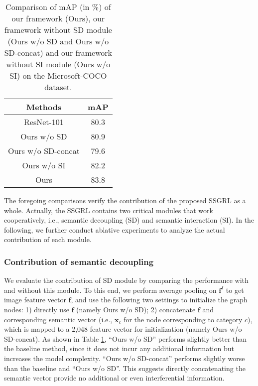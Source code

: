 \documentclass[10pt,twocolumn,letterpaper]{article}
\begin{document}
\begin{table}[!t]
\centering
\begin{tabular}{c|c}
\hline
\centering  Methods & mAP \\
\hline
\hline
ResNet-101 \cite{he2016deep} &80.3\\
\hline
Ours w/o SD & 80.9  \\
Ours w/o SD-concat & 79.6  \\
Ours w/o SI & 82.2  \\
Ours & 83.8   \\
\hline
\end{tabular}
\vspace{2pt}
\caption{Comparison of mAP (in \%) of our framework (Ours), our framework without SD module (Ours w/o SD and Ours w/o SD-concat) and our framework without SI module (Ours w/o SI) on the Microsoft-COCO dataset.}
\label{table:result-ablation}
\end{table}

The foregoing comparisons verify the contribution of the proposed SSGRL as a whole. Actually, the SSGRL contains two critical modules that work cooperatively, i.e., semantic decoupling (SD) and semantic interaction (SI). In the following, we further conduct ablative experiments to analyze the actual contribution of each module.



\subsubsection{Contribution of semantic decoupling}
We evaluate the contribution of SD module by comparing the performance with and without this module. To this end, we perform average pooling on $\mathbf{f}^I$ to get image feature vector $\mathbf{f}$, and use the following two settings to initialize the graph nodes: 1) directly use $\mathbf{f}$ (namely Ours w/o SD); 2) concatenate $\mathbf{f}$ and corresponding semantic vector (i.e., $\mathbf{x}_c$ for the node corresponding to category $c$), which is mapped to a 2,048 feature vector for initialization (namely Ours w/o SD-concat). As shown in Table \ref{table:result-ablation}, ``Ours w/o SD'' performs slightly better than the baseline method, since it does not incur any additional information but increases the model complexity. ``Ours w/o SD-concat'' performs slightly worse than the baseline and ``Ours w/o SD''. This suggests directly concatenating the semantic vector provide no additional or even interferential information.
\end{document}
